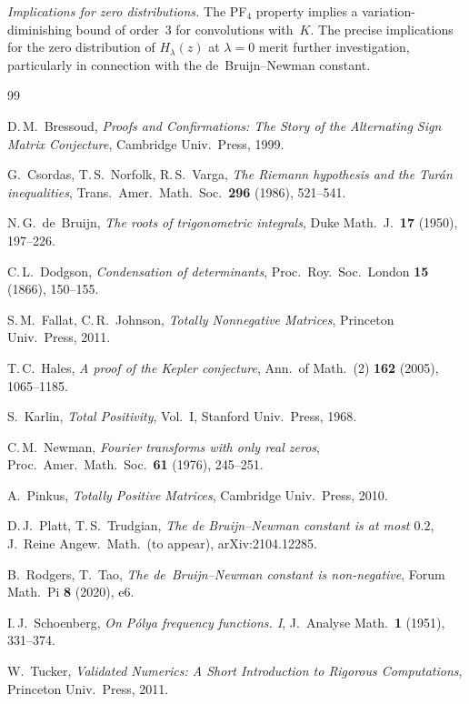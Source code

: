 \documentclass[11pt,a4paper]{amsart}
\theoremstyle{definition}
\theoremstyle{remark}
\begin{document}
\emph{Implications for zero distributions.}
The PF$_4$ property implies a variation-diminishing bound
of order~$3$ for convolutions with~$K$.
The precise implications for the zero distribution of
$H_\lambda(z)$ at $\lambda = 0$ merit further investigation,
particularly in connection with the de~Bruijn--Newman constant.



\begin{thebibliography}{99}

D.\,M.~Bressoud,
\emph{Proofs and Confirmations: The Story of the Alternating Sign
Matrix Conjecture},
Cambridge Univ.\ Press, 1999.

G.~Csordas, T.\,S.~Norfolk, R.\,S.~Varga,
\emph{The Riemann hypothesis and the Tur\'an inequalities},
Trans.\ Amer.\ Math.\ Soc.\ \textbf{296} (1986), 521--541.

N.\,G.~de~Bruijn,
\emph{The roots of trigonometric integrals},
Duke Math.\ J.\ \textbf{17} (1950), 197--226.

C.\,L.~Dodgson,
\emph{Condensation of determinants},
Proc.\ Roy.\ Soc.\ London \textbf{15} (1866), 150--155.

S.\,M.~Fallat, C.\,R.~Johnson,
\emph{Totally Nonnegative Matrices},
Princeton Univ.\ Press, 2011.

T.\,C.~Hales,
\emph{A proof of the Kepler conjecture},
Ann.\ of Math.\ (2) \textbf{162} (2005), 1065--1185.

S.~Karlin,
\emph{Total Positivity}, Vol.~I,
Stanford Univ.\ Press, 1968.

C.\,M.~Newman,
\emph{Fourier transforms with only real zeros},
Proc.\ Amer.\ Math.\ Soc.\ \textbf{61} (1976), 245--251.

A.~Pinkus,
\emph{Totally Positive Matrices},
Cambridge Univ.\ Press, 2010.

D.\,J.~Platt, T.\,S.~Trudgian,
\emph{The de Bruijn--Newman constant is at most $0.2$},
J.\ Reine Angew.\ Math.\ (to appear), arXiv:2104.12285.

B.~Rodgers, T.~Tao,
\emph{The de~Bruijn--Newman constant is non-negative},
Forum Math.\ Pi \textbf{8} (2020), e6.

I.\,J.~Schoenberg,
\emph{On P\'olya frequency functions. I},
J.\ Analyse Math.\ \textbf{1} (1951), 331--374.

W.~Tucker,
\emph{Validated Numerics: A Short Introduction to Rigorous Computations},
Princeton Univ.\ Press, 2011.

\end{thebibliography}
\end{document}
